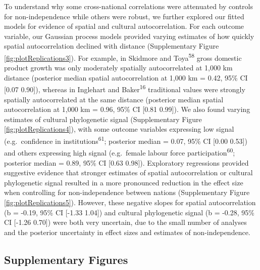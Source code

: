 \documentclass[
  man,floatsintext]{apa6}
\begin{document}
To understand why some cross-national correlations were attenuated by controls for non-independence while others were robust, we further explored our fitted models for evidence of spatial and cultural autocorrelation. For each outcome variable, our Gaussian process models provided varying estimates of how quickly spatial autocorrelation declined with distance (Supplementary Figure \ref{fig:plotReplications3}). For example, in Skidmore and Toya\textsuperscript{58} gross domestic product growth was only moderately spatially autocorrelated at 1,000 km distance (posterior median spatial autocorrelation at 1,000 km = 0.42, 95\% CI {[}0.07 0.90{]}), whereas in Inglehart and Baker\textsuperscript{16} traditional values were strongly spatially autocorrelated at the same distance (posterior median spatial autocorrelation at 1,000 km = 0.96, 95\% CI {[}0.81 0.99{]}). We also found varying estimates of cultural phylogenetic signal (Supplementary Figure \ref{fig:plotReplications4}), with some outcome variables expressing low signal (e.g.~confidence in institutions\textsuperscript{61}; posterior median = 0.07, 95\% CI {[}0.00 0.53{]}) and others expressing high signal (e.g.~female labour force participation\textsuperscript{60}; posterior median = 0.89, 95\% CI {[}0.63 0.98{]}). Exploratory regressions provided suggestive evidence that stronger estimates of spatial autocorrelation or cultural phylogenetic signal resulted in a more pronounced reduction in the effect size when controlling for non-independence between nations (Supplementary Figure \ref{fig:plotReplications5}). However, these negative slopes for spatial autocorrelation (b = -0.19, 95\% CI {[}-1.33 1.04{]}) and cultural phylogenetic signal (b = -0.28, 95\% CI {[}-1.26 0.70{]}) were both very uncertain, due to the small number of analyses and the posterior uncertainty in effect sizes and estimates of non-independence.

\newpage

\hypertarget{supplementary-figures}{%
\subsection{Supplementary Figures}\label{supplementary-figures}}
\end{document}
